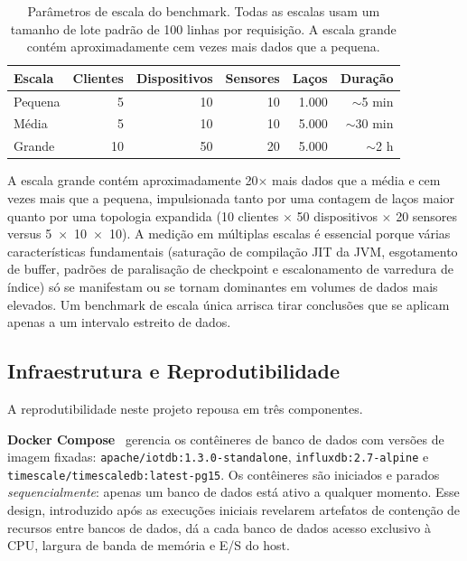 \begin{table}[t]
  \centering
  \caption{Parâmetros de escala do benchmark. Todas as escalas usam um tamanho de lote padrão
    de 100 linhas por requisição. A escala grande contém aproximadamente cem vezes mais dados
  que a pequena.}
  \label{tab:scales}
  \begin{tabular}{lrrrrr}
    \hline
    \textbf{Escala} & \textbf{Clientes} & \textbf{Dispositivos} & \textbf{Sensores} & \textbf{Laços} & \textbf{Duração} \\
    \hline
    Pequena &  5 & 10 & 10 & 1.000 & ${\sim}$5 min \\
    Média   &  5 & 10 & 10 & 5.000 & ${\sim}$30 min \\
    Grande  & 10 & 50 & 20 & 5.000 & ${\sim}$2 h \\
    \hline
  \end{tabular}
\end{table}

A escala grande contém aproximadamente 20$\times$ mais dados que a média e cem vezes mais
que a pequena, impulsionada tanto por uma contagem de laços maior quanto por uma topologia
expandida (10 clientes $\times$ 50 dispositivos $\times$ 20 sensores versus
5~$\times$~10~$\times$~10). A medição em múltiplas escalas é essencial porque várias
características fundamentais (saturação de compilação JIT da JVM, esgotamento de buffer,
padrões de paralisação de checkpoint e escalonamento de varredura de índice) só se
manifestam ou se tornam dominantes em volumes de dados mais elevados. Um benchmark de escala
única arrisca tirar conclusões que se aplicam apenas a um intervalo estreito de dados.

\subsection{Infraestrutura e Reprodutibilidade}
\label{sec:infrastructure}

A reprodutibilidade neste projeto repousa em três componentes.

\textbf{Docker Compose}~\cite{docker} gerencia os contêineres de banco de dados com versões
de imagem fixadas: \texttt{apache/iotdb:1.3.0-standalone}, \texttt{influxdb:2.7-alpine} e
\texttt{timescale/timescaledb:latest-pg15}. Os contêineres são iniciados e parados
\textit{sequencialmente}: apenas um banco de dados está ativo a qualquer momento. Esse design,
introduzido após as execuções iniciais revelarem artefatos de contenção de recursos entre bancos
de dados, dá a cada banco de dados acesso exclusivo à CPU, largura de banda de memória e E/S
do host.

